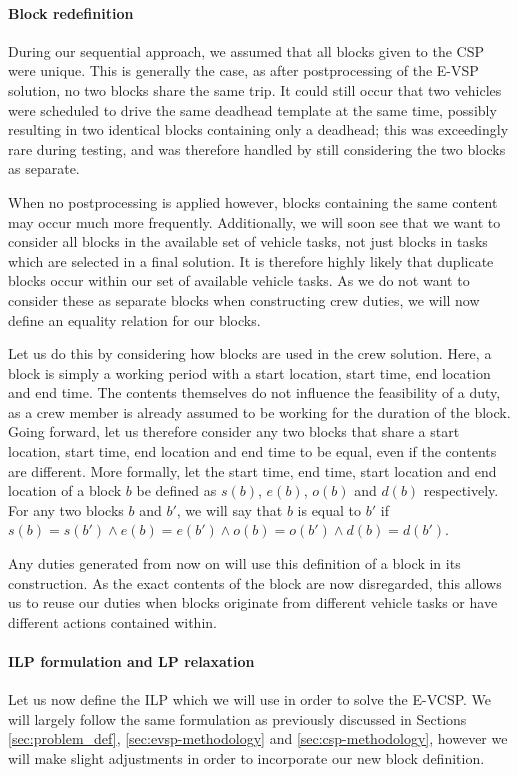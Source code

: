\documentclass[]{article}
\begin{document}
\paragraph{Block redefinition} During our sequential approach, we assumed that all blocks given to the CSP were unique. This is generally the case, as after postprocessing of the E-VSP solution, no two blocks share the same trip. It could still occur that two vehicles were scheduled to drive the same deadhead template at the same time, possibly resulting in two identical blocks containing only a deadhead; this was exceedingly rare during testing, and was therefore handled by still considering the two blocks as separate.

When no postprocessing is applied however, blocks containing the same content may occur much more frequently. Additionally, we will soon see that we want to consider all blocks in the available set of vehicle tasks, not just blocks in tasks which are selected in a final solution. It is therefore highly likely that duplicate blocks occur within our set of available vehicle tasks. As we do not want to consider these as separate blocks when constructing crew duties, we will now define an equality relation for our blocks. 

Let us do this by considering how blocks are used in the crew solution. Here, a block is simply a working period with a start location, start time, end location and end time. The contents themselves do not influence the feasibility of a duty, as a crew member is already assumed to be working for the duration of the block. Going forward, let us therefore consider any two blocks that share a start location, start time, end location and end time to be equal, even if the contents are different. More formally, let the start time, end time, start location and end location of a block $b$ be defined as $s(b)$, $e(b)$, $o(b)$ and $d(b)$ respectively. For any two blocks $b$ and $b'$, we will say that $b$ is equal to $b'$ if $s(b) = s(b') \wedge e(b) = e(b') \wedge o(b) = o(b') \wedge d(b) = d(b')$. 

Any duties generated from now on will use this definition of a block in its construction. As the exact contents of the block are now disregarded, this allows us to reuse our duties when blocks originate from different vehicle tasks or have different actions contained within. 

\paragraph{ILP formulation and LP relaxation} Let us now define the ILP which we will use in order to solve the E-VCSP. We will largely follow the same formulation as previously discussed in Sections \ref{sec:problem_def}, \ref{sec:evsp-methodology} and \ref{sec:csp-methodology}, however we will make slight adjustments in order to incorporate our new block definition. 
\end{document}
